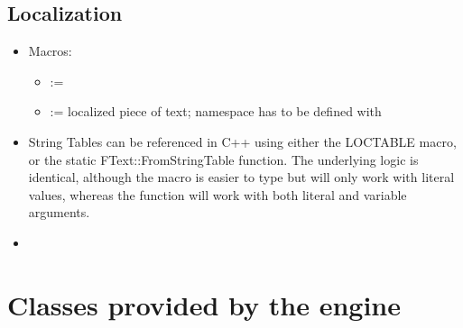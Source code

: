             \subsection{Localization}
                \begin{itemize}
                    \item Macros:
                    \begin{itemize}
                        \item {} := 
                        \item {} := localized piece of text;  namespace has to be defined with 
                    \end{itemize}
                    \item String Tables can be referenced in C++ using either the LOCTABLE macro, or the static FText::FromStringTable function. The underlying logic is identical, although the macro is easier to type but will only work with literal values, whereas the function will work with both literal and variable arguments. 
                    \item 
                \end{itemize}

    \section{Classes provided by the engine}
